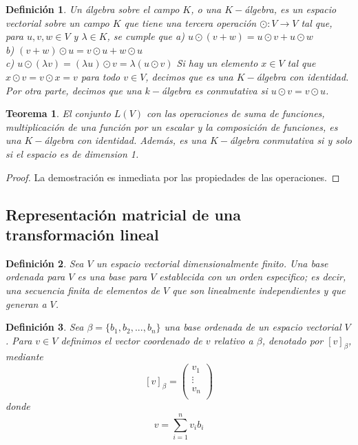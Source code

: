 \documentclass{book}
\newtheorem{theorem}{Teorema}
\newtheorem{definition}{Definición}
\begin{document}
\begin{definition}
Un álgebra sobre el campo $K$, o una $K-$álgebra, es un espacio vectorial sobre un campo $K$ que tiene una tercera operación $\odot:V\rightarrow V$ tal que, para $u,v,w \in V$ y $\lambda \in K$, se cumple que \newline \newline
a) $u\odot (v+w)=u\odot v+u\odot w$\\
b) $(v+w)\odot u=v\odot u+w\odot u$\\
c) $u\odot (\lambda v)=(\lambda u)\odot v=\lambda (u\odot v)$
\newline \newline
Si hay un elemento $x\in V$ tal que $x\odot v=v\odot x=v$ para todo $v\in V$, decimos que es una $K-$álgebra con identidad. Por otra parte, decimos que una $k-$álgebra es conmutativa si $u\odot v=v\odot u$.
\end{definition}

\begin{theorem}
El conjunto $L(V)$ con las operaciones de suma de funciones, multiplicación de una función por un escalar y la composición de funciones, es una $K-$álgebra con identidad. Además, es una $K-$álgebra conmutativa si y solo si el espacio es de dimension 1.  
\end{theorem}

\begin{proof}
La demostración es inmediata por las propiedades de las operaciones.
\end{proof}

\subsection{Representación matricial de una transformación lineal}

\begin{definition}
Sea $V$ un espacio vectorial dimensionalmente finito. Una base ordenada para $V$ es una base para $V$ establecida con un orden especifico; es decir, una secuencia finita de elementos de $V$ que son linealmente independientes y que generan a $V$.
\end{definition}

\begin{definition}
Sea $\beta =\{ b_1,b_2,...,b_n\}$ una base ordenada de un espacio vectorial $V$. Para $v\in V$ definimos el vector coordenado de $v$ relativo a $\beta$, denotado por $[ v ]_{\beta}$, mediante
\[
[v]_{\beta}=\left( \begin{array}{c} v_1\\\vdots\\ v_n\\ \end{array} \right)
\]
donde
\[
v=\sum_{i=1}^{n}v_i b_i
\]
\end{definition}
\end{document}
